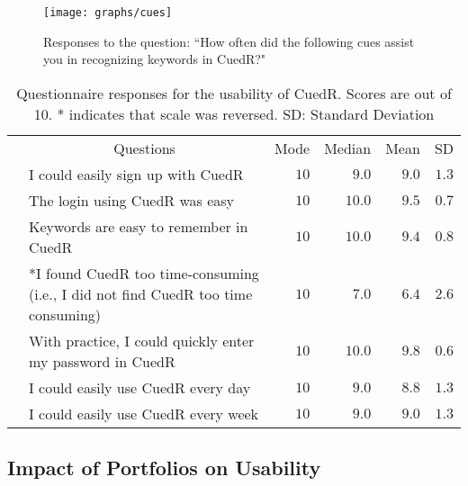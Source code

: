 \begin{figure}[t]
\centering
\texttt{[image: graphs/cues]}
\caption{Responses to the question: ``How often did the following cues assist you in recognizing keywords in CuedR?"}
\label{fig:cues}
\end{figure}


\begin{table*}[t]
\renewcommand{\arraystretch}{1.3}
\caption{Questionnaire responses for the usability of CuedR. Scores are
  out of 10. * indicates that scale was reversed. SD: Standard Deviation}  \centering
\vspace{0.2cm}
\begin{tabular}{c@{}m{8.5cm}rrrr@{}}
\hline
\hspace{0.2cm}&\multicolumn{1}{c}{Questions}&\multicolumn{1}{c}{Mode}&\multicolumn{1}{c}{Median}&\multicolumn{1}{c}{Mean}&\multicolumn{1}{c}{SD}\\ 
\cline{2-6}
& I could easily sign up with CuedR&$10$\phantom{a}&$9.0$\phantom{ab}&$9.0$\phantom{a}&$1.3$\phantom{m}\\
\cline{2-6}
& The login using CuedR was easy&$10$\phantom{a}&$10.0$\phantom{ab}&$9.5$\phantom{a}&$0.7$\phantom{m}\\ 
\cline{2-6}
& Keywords are easy to remember in CuedR &$10$\phantom{a}&$10.0$\phantom{ab}&$9.4$\phantom{a}&$0.8$\phantom{m}\\ 
\cline{2-6}
& *I found CuedR too time-consuming \newline (i.e., I did not find CuedR too time consuming) &$10$\phantom{a}&$7.0$\phantom{ab}&$6.4$\phantom{a}&$2.6$\phantom{m}\\
\cline{2-6}
& With practice, I could quickly enter my password in CuedR &$10$\phantom{a}&$10.0$\phantom{ab}&$9.8$\phantom{a}&$0.6$\phantom{m}\\
\cline{2-6}
& I could easily use CuedR every day&$10$\phantom{a}&$9.0$\phantom{ab}&$8.8$\phantom{a}&$1.3$\phantom{m}\\ 
\cline{2-6}
& I could easily use CuedR every week&$10$\phantom{a}&$9.0$\phantom{ab}&$9.0$\phantom{a}&$1.3$\phantom{m}\\ 
\hline
\end{tabular}
\label{tab:usability}
\end{table*}


\subsection{Impact of Portfolios on Usability}\label{im_portfolio}


